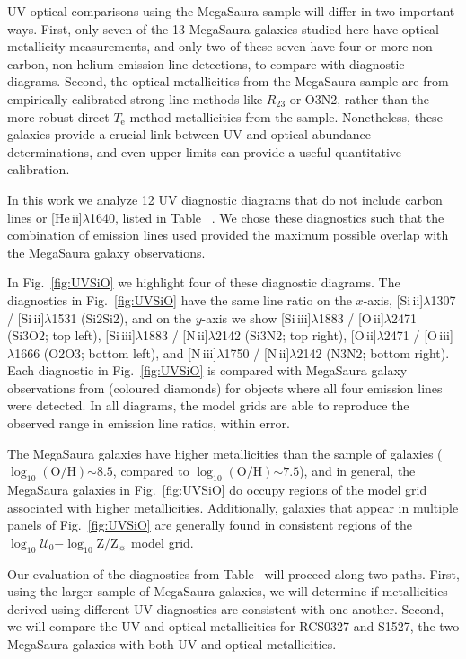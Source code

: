 \documentclass[preprint2]{aastex62}
\newcommand{\nii}{[N\,{\sc ii}]\xspace}
\newcommand{\niii}{[N\,{\sc iii}]\xspace}
\newcommand{\oiii}{[O\,{\sc iii}]\xspace}
\newcommand{\oii}{[O\,{\sc ii}]\xspace}
\newcommand{\heii}{[He\,{\sc ii}]\xspace}
\newcommand{\SiuII}{[Si\,{\sc ii}]\xspace}
\newcommand{\SiuIII}{[Si\,{\sc iii}]\xspace}
\newcommand{\logten}{\ensuremath{\log_{10}}}
\newcommand{\logZ}{\ensuremath{\logten \mathrm{Z}/\mathrm{Z}_{\sun}}\xspace}
\newcommand{\logOH}{\ensuremath{\logten (\mathrm{O}/\mathrm{H})}\xspace}
\newcommand{\logU}{\ensuremath{\logten \mathcal{U}_0}}
\newcommand{\mage}{{\sc Meg}a{\sc S}a{\sc ura}\xspace}
\newcommand{\Te}{\ensuremath{T_{\mathrm{e}}}\xspace}
\newcommand{\XXX}{{\bf \color{red}{XXX} }}
\begin{document}
UV-optical comparisons using the \mage sample will differ in two important ways. First, only seven of the 13 \mage galaxies studied here have optical metallicity measurements, and only two of these seven have four or more non-carbon, non-helium emission line detections, to compare with diagnostic diagrams. Second, the optical metallicities from the \mage sample are from empirically calibrated strong-line methods like $R_{23}$ or O3N2, rather than the more robust direct-\Te method metallicities from the \citet{Berg+2016} sample. Nonetheless, these galaxies provide a crucial link between UV and optical abundance determinations, and even upper limits can provide a useful quantitative calibration.

In this work we analyze 12 UV diagnostic diagrams that do not include carbon lines or \heii$\lambda$1640, listed in Table~\XXX. We chose these diagnostics such that the combination of emission lines used provided the maximum possible overlap with the \mage galaxy observations.

In Fig.~\ref{fig:UVSiO} we highlight four of these diagnostic diagrams. The diagnostics in Fig.~\ref{fig:UVSiO} have the same line ratio on the $x$-axis, \SiuII$\lambda$1307 / \SiuII$\lambda$1531 (Si2Si2), and on the $y$-axis we show \SiuIII$\lambda$1883 / \oii$\lambda$2471  (Si3O2; top left), \SiuIII$\lambda$1883 / \nii$\lambda$2142 (Si3N2; top right), \oii$\lambda$2471 / \oiii$\lambda$1666 (O2O3; bottom left), and \niii$\lambda$1750 / \nii$\lambda$2142 (N3N2; bottom right). Each diagnostic in Fig.~\ref{fig:UVSiO} is compared with \mage galaxy observations from \citet{Rigby+2018b} (coloured diamonds) for objects where all four emission lines were detected. In all diagrams, the model grids are able to reproduce the observed range in emission line ratios, within error.

The \mage galaxies have higher metallicities than the \citet{Berg+2016} sample of galaxies (\logOH${\sim}8.5$, compared to \logOH${\sim}7.5$), and in general, the \mage galaxies in Fig.~\ref{fig:UVSiO} do occupy regions of the model grid associated with higher metallicities. Additionally, galaxies that appear in multiple panels of Fig.~\ref{fig:UVSiO} are generally found in consistent regions of the \logU$-$\logZ model grid. 

Our evaluation of the diagnostics from Table~\XXX will proceed along two paths. First, using the larger sample of \mage galaxies, we will determine if metallicities derived using different UV diagnostics are consistent with one another. Second, we will compare the UV and optical metallicities for RCS0327 and S1527, the two \mage galaxies with both UV and optical metallicities.
\end{document}
